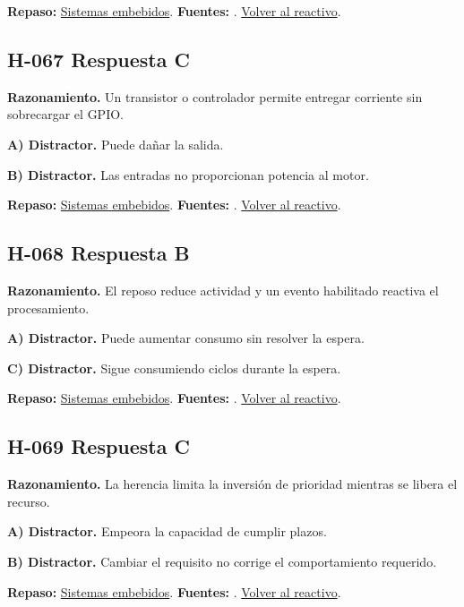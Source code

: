 \textbf{Repaso:} \hyperref[sec:h3]{Sistemas embebidos}. \textbf{Fuentes:} \cite{avr,arduino,sensors}. \hyperref[q:H-066]{Volver al reactivo}.\par\medskip

\subsection*{H-067 \quad Respuesta C}\label{s:H-067}
\textbf{Razonamiento.} Un transistor o controlador permite entregar corriente sin sobrecargar el GPIO.

\textbf{A) Distractor. }Puede dañar la salida.

\textbf{B) Distractor. }Las entradas no proporcionan potencia al motor.

\textbf{Repaso:} \hyperref[sec:h3]{Sistemas embebidos}. \textbf{Fuentes:} \cite{avr,arduino,sensors}. \hyperref[q:H-067]{Volver al reactivo}.\par\medskip

\subsection*{H-068 \quad Respuesta B}\label{s:H-068}
\textbf{Razonamiento.} El reposo reduce actividad y un evento habilitado reactiva el procesamiento.

\textbf{A) Distractor. }Puede aumentar consumo sin resolver la espera.

\textbf{C) Distractor. }Sigue consumiendo ciclos durante la espera.

\textbf{Repaso:} \hyperref[sec:h3]{Sistemas embebidos}. \textbf{Fuentes:} \cite{avr,arduino,sensors}. \hyperref[q:H-068]{Volver al reactivo}.\par\medskip

\subsection*{H-069 \quad Respuesta C}\label{s:H-069}
\textbf{Razonamiento.} La herencia limita la inversión de prioridad mientras se libera el recurso.

\textbf{A) Distractor. }Empeora la capacidad de cumplir plazos.

\textbf{B) Distractor. }Cambiar el requisito no corrige el comportamiento requerido.

\textbf{Repaso:} \hyperref[sec:h3]{Sistemas embebidos}. \textbf{Fuentes:} \cite{avr,arduino,sensors}. \hyperref[q:H-069]{Volver al reactivo}.\par\medskip

